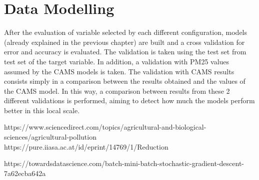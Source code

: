 \section{Data Modelling}
After the evaluation of variable selected by each different configuration, models (already explained in the previous chapter) are built and a cross validation for error and accuracy is evaluated. The validation is taken using the test set from test set of the target variable. In addition, a validation with PM25 values assumed by the CAMS models is taken. The validation with CAMS results consists simply in a comparison between the results obtained and the values of the CAMS model.  
\newline
In this way, a comparison between results from these 2 different validations is performed, aiming to detect how much the models perform better in this local scale.\par

https://www.sciencedirect.com/topics/agricultural-and-biological-sciences/agricultural-pollution 
https://pure.iiasa.ac.at/id/eprint/14769/1/Reduction%

https://towardsdatascience.com/batch-mini-batch-stochastic-gradient-descent-7a62ecba642a